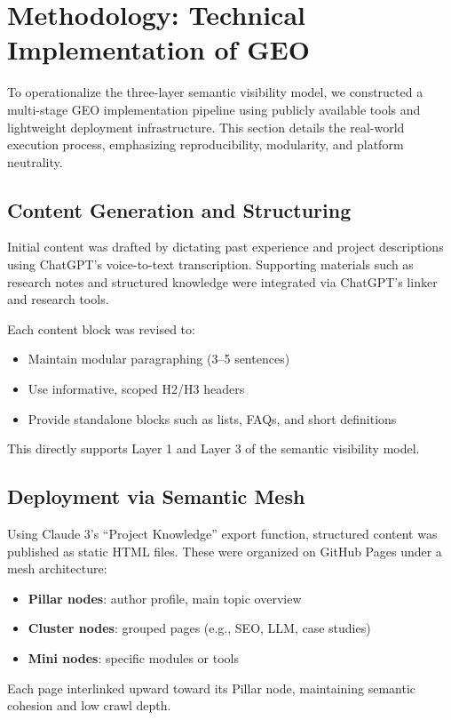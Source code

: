 \section{Methodology: Technical Implementation of GEO}

To operationalize the three-layer semantic visibility model, we constructed a multi-stage GEO implementation pipeline using publicly available tools and lightweight deployment infrastructure. This section details the real-world execution process, emphasizing reproducibility, modularity, and platform neutrality.

\subsection{Content Generation and Structuring}

Initial content was drafted by dictating past experience and project descriptions using ChatGPT’s voice-to-text transcription. Supporting materials such as research notes and structured knowledge were integrated via ChatGPT’s linker and research tools.

Each content block was revised to:
\begin{itemize}
  \item Maintain modular paragraphing (3--5 sentences)
  \item Use informative, scoped H2/H3 headers
  \item Provide standalone blocks such as lists, FAQs, and short definitions
\end{itemize}
This directly supports Layer 1 and Layer 3 of the semantic visibility model.

\subsection{Deployment via Semantic Mesh}

Using Claude 3’s “Project Knowledge” export function, structured content was published as static HTML files. These were organized on GitHub Pages under a mesh architecture:
\begin{itemize}
  \item \textbf{Pillar nodes}: author profile, main topic overview
  \item \textbf{Cluster nodes}: grouped pages (e.g., SEO, LLM, case studies)
  \item \textbf{Mini nodes}: specific modules or tools
\end{itemize}
Each page interlinked upward toward its Pillar node, maintaining semantic cohesion and low crawl depth.

